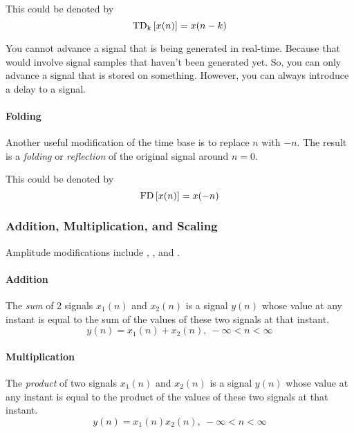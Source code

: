 This could be denoted by
\begin{equation}\label{eq:Shifting in Time}
  \operatorname{\mathrm{TD}_{k}} \left[ x(n) \right] = x(n-k)
\end{equation}

You cannot advance a signal that is being generated in real-time.
Because that would involve signal samples that haven't been generated yet.
So, you can only advance a signal that is stored on something.
However, you can always introduce a delay to a signal.

\paragraph{Folding}\label{par:Folding}
Another useful modification of the time base is to replace $n$ with $-n$.
The result is a \emph{folding} or \emph{reflection} of the original signal around $n=0$.

This could be denoted by
\begin{equation}\label{eq:Folding}
  \operatorname{\mathrm{FD}} \left[ x(n) \right] = x(-n)
\end{equation}

\subsubsection{Addition, Multiplication, and Scaling}\label{subsubsec:Addition Multiplication and Scaling}
Amplitude modifications include , , and .

\paragraph{Addition}\label{par:Amplitude Addition}
The \emph{sum} of 2 signals $x_{1}(n)$ and $x_{2}(n)$ is a signal $y(n)$ whose value at any instant is equal to the sum of the values of these two signals at that instant.
\begin{equation}\label{eq:Amplitude Addition}
  y(n) = x_{1}(n) + x_{2}(n), \> -\infty < n < \infty
\end{equation}

\paragraph{Multiplication}\label{par:Amplitude Multiplication}
The \emph{product} of two signals $x_{1}(n)$ and $x_{2}(n)$ is a signal $y(n)$ whose value at any instant is equal to the product of the values of these two signals at that instant.
\begin{equation}\label{eq:Amplitude Multiplication}
  y(n) = x_{1}(n) x_{2}(n), \> -\infty < n < \infty
\end{equation}

